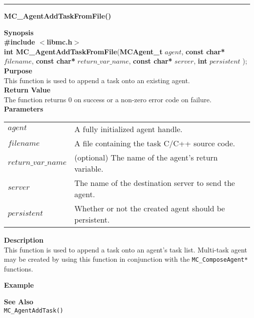 \noindent
\vspace{5pt}
\rule{6.5in}{0.015in}
\noindent
{}
{\LARGE \bf MC\_AgentAddTaskFromFile()}\\

\noindent
{\bf Synopsis}\\
{\bf \#include $<$libmc.h$>$}\\
{\bf int MC\_AgentAddTaskFromFile}({\bf MCAgent\_t} $agent$, 
                                  {\bf const char*} $filename$,
                                  {\bf const char*} $return\_var\_name$,
                                  {\bf const char*} $server$,
                                  {\bf int} $persistent$
																	);\\

\noindent
{\bf Purpose}\\
This function is used to append a task onto an existing agent.\\

\noindent
{\bf Return Value}\\
The function returns 0 on success or a non-zero error code on failure.\\

\noindent
{\bf Parameters}
\vspace{-0.1in}
\begin{description}
\item
\begin{tabular}{p{30 mm}p{125 mm}} 
$agent$ & A fully initialized agent handle.\\
$filename$ & A file containing the task C/C++ source code.\\
$return\_var\_name$ & (optional) The name of the agent's return variable.\\
$server$ & The name of the destination server to send the agent.\\
$persistent$ & Whether or not the created agent should be persistent.\\
\end{tabular}
\end{description}

\noindent
{\bf Description}\\
This function is used to append a task onto an agent's task list. Multi-task
agent may be created by using this function in conjunction with the
\texttt{MC\_ComposeAgent*} functions.

\noindent
{\bf Example}\\
\noindent
{\footnotesize}

\noindent
{\bf See Also}\\
\texttt{MC\_AgentAddTask()}

